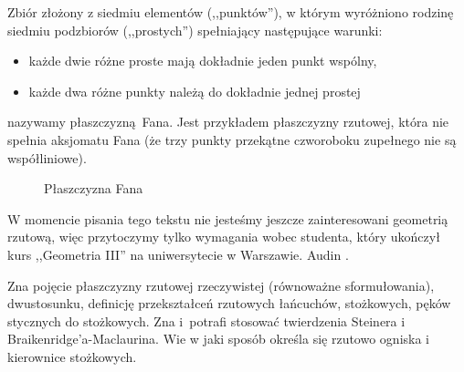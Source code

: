 \begin{example}
    Zbiór złożony z siedmiu elementów (,,punktów''), w którym wyróżniono rodzinę siedmiu podzbiorów (,,prostych'') spełniający następujące warunki: 
    \begin{itemize}
        \item każde dwie różne proste mają dokładnie jeden punkt wspólny,
        \item każde dwa różne punkty należą do dokładnie jednej prostej
    \end{itemize}
    nazywamy płaszczyzną Fana.
    Jest przykładem płaszczyzny rzutowej, która nie spełnia aksjomatu Fana (że trzy punkty przekątne czworoboku zupełnego nie są współliniowe). 
    \begin{figure}[H]
        \centering
    \caption{Płaszczyzna Fana}
\end{figure}
\end{example}

W momencie pisania tego tekstu nie jesteśmy jeszcze zainteresowani geometrią rzutową, więc przytoczymy tylko wymagania wobec studenta, który ukończył kurs ,,Geometria III'' na uniwersytecie w Warszawie.
Audin \cite[s. 143-182]{audin_2003}.


Zna pojęcie płaszczyzny rzutowej rzeczywistej (równoważne sformułowania), dwustosunku, definicję przekształceń rzutowych łańcuchów, stożkowych, pęków stycznych do stożkowych.
%
%
%
Zna i~potrafi stosować twierdzenia Steinera i Braikenridge'a-Maclaurina.
%
%
Wie w jaki sposób określa się rzutowo ogniska i kierownice stożkowych.
%
%

